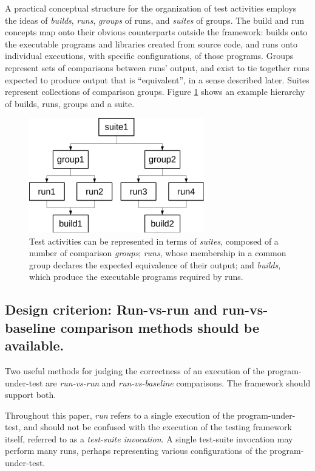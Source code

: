 \documentclass[conference]{IEEEtran}
\begin{document}
A practical conceptual structure for the organization of test activities employs the ideas of \emph{builds}, \emph{runs}, \emph{groups} of runs, and \emph{suites} of groups. The build and run concepts map onto their obvious counterparts outside the framework: builds onto the executable programs and libraries created from source code, and runs onto individual executions, with specific configurations, of those programs. Groups represent sets of comparisons between runs' output, and exist to tie together runs expected to produce output that is ``equivalent'', in a sense described later. Suites represent collections of comparison groups. Figure \ref{figure:1} shows an example hierarchy of builds, runs, groups and a suite.

\begin{figure}[!t]
\centering
\includegraphics[width=3in]{fig5.pdf}
\caption{Test activities can be represented in terms of \emph{suites}, composed of a number of comparison \emph{groups}; \emph{runs}, whose membership in a common group declares the expected equivalence of their output; and \emph{builds}, which produce the executable programs required by runs.}
\label{figure:1}
\end{figure}

\subsection{Design criterion: Run-vs-run and run-vs-baseline comparison methods should be available.}

Two useful methods for judging the correctness of an execution of the program-under-test are \emph{run-vs-run} and \emph{run-vs-baseline} comparisons. The framework should support both.

Throughout this paper, \emph{run} refers to a single execution of the program-under-test, and should not be confused with the execution of the testing framework itself, referred to as a \emph{test-suite invocation}. A single test-suite invocation may perform many runs, perhaps representing various configurations of the program-under-test.
\end{document}
